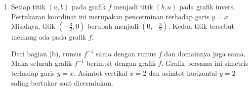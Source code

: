 \documentclass[11pt,a4paper]{article}
\begin{document}
\begin{enumerate}
        Misalkan $y=\frac{2x+3}{x-2}$, dengan $x\ne2$.
        Kalikan kedua ruas dengan $x-2$, lalu kumpulkan suku yang memuat $x$:
        \begin{align*}
          y(x-2) & =2x+3,                          \\
          xy-2y  & =2x+3,                          \\
          xy-2x  & =2y+3,                          \\
          x(y-2) & =2y+3,                          \\
          x      & =\frac{2y+3}{y-2}\qquad(y\ne2).
        \end{align*}
        Tukar nama variabel $x$ dan $y$ agar masukan invers ditulis sebagai $x$:
        \[
          \boxed{f^{-1}(x)=\frac{2x+3}{x-2}}.
        \]
        \textbf{Domain dan range.}
        Pada fungsi semula, $D_f=\mathbb{R}\setminus\{2\}$ karena penyebut tidak boleh nol.
        Untuk mencari range, gunakan $f(x)=2+\frac7{x-2}$.
        Pecahan ini tidak pernah nol, sehingga $f(x)$ tidak pernah bernilai $2$.

        Setiap nilai $y\ne2$ dapat dicapai.
        Nilai masukannya adalah $x=\frac{2y+3}{y-2}$, seperti hasil perhitungan di atas.
        Masukan ini sah karena $x-2=\frac7{y-2}\ne0$.
        Jadi, $R_f=\mathbb{R}\setminus\{2\}$.
        Perhitungan tersebut juga memberi tepat satu masukan untuk setiap $y\ne2$,
        sehingga inversnya merupakan fungsi.

        Domain invers sama dengan range fungsi semula.
        Range invers sama dengan domain fungsi semula.
        Karena itu,
        \[
          \boxed{D_{f^{-1}}=R_{f^{-1}}=(-\infty,2)\cup(2,\infty)}.
        \]

        \newpage
  \item Setiap titik $(a,b)$ pada grafik $f$ menjadi titik $(b,a)$ pada grafik invers.
        Pertukaran koordinat ini merupakan pencerminan terhadap garis $y=x$.
        Misalnya, titik $(-\frac32,0)$ berubah menjadi $(0,-\frac32)$.
        Kedua titik tersebut memang ada pada grafik $f$.

        Dari bagian (b), rumus $f^{-1}$ sama dengan rumus $f$ dan domainnya juga sama.
        Maka seluruh grafik $f^{-1}$ berimpit dengan grafik $f$.
        Grafik bersama ini simetris terhadap garis $y=x$.
        Asimtot vertikal $x=2$ dan asimtot horizontal $y=2$ saling bertukar saat dicerminkan.


\end{enumerate}
\end{document}
